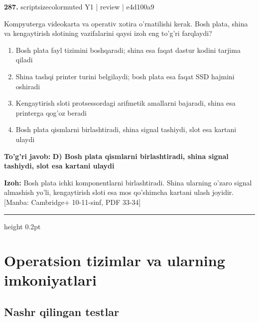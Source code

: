 \documentclass[10pt,a4paper]{article}
\begin{document}
{\bfseries\sffamily\color{ink} 287.} {scriptsizecolor{muted} Y1 | review | e4d100a9}
\par
Kompyuterga videokarta va operativ xotira o'rnatilishi kerak. Bosh plata, shina va kengaytirish slotining vazifalarini qaysi izoh eng to'g'ri farqlaydi?
\begin{enumerate}[label=\Alph*),leftmargin=9mm]
\item Bosh plata fayl tizimini boshqaradi; shina esa faqat dastur kodini tarjima qiladi
\item Shina tashqi printer turini belgilaydi; bosh plata esa faqat SSD hajmini oshiradi
\item Kengaytirish sloti protsessordagi arifmetik amallarni bajaradi, shina esa printerga qog'oz beradi
\item Bosh plata qismlarni birlashtiradi, shina signal tashiydi, slot esa kartani ulaydi
\end{enumerate}
\begin{tcolorbox}[enhanced,breakable,colback=teal!4,colframe=teal!60!black,boxrule=0.45pt,arc=1.2mm,left=2.7mm,right=2.7mm,top=1.8mm,bottom=1.8mm,before skip=2mm,after skip=2mm]
{\bfseries\sffamily\color{teal}To'g'ri javob:} \textbf{D) Bosh plata qismlarni birlashtiradi, shina signal tashiydi, slot esa kartani ulaydi}
\par\smallskip
{\bfseries Izoh:} Bosh plata ichki komponentlarni birlashtiradi. Shina ularning o'zaro signal almashish yo'li, kengaytirish sloti esa mos qo'shimcha kartani ulash joyidir. [Manba: Cambridge+ 10-11-sinf, PDF 33-34]
\end{tcolorbox}
\vspace{2mm}\hrule height 0.2pt\vspace{3mm}
\clearpage
\section{Operatsion tizimlar va ularning imkoniyatlari}
\subsection{Nashr qilingan testlar}
\end{document}
